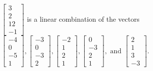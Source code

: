 \begin{exercise}
\begin{exerciseStatement}
  \end{exerciseStatement}
  \begin{exerciseAnswer}
   \(\left[\begin{array}{c}
3 \\
2 \\
12 \\
-1
\end{array}\right]\) 
  	 is  
	a linear combination of the vectors \(\left[\begin{array}{c}
-4 \\
0 \\
-5 \\
1
\end{array}\right] , \left[\begin{array}{c}
-3 \\
0 \\
-3 \\
2
\end{array}\right] , \left[\begin{array}{c}
-2 \\
1 \\
2 \\
1
\end{array}\right] , \left[\begin{array}{c}
0 \\
-3 \\
2 \\
1
\end{array}\right] , \text{ and } \left[\begin{array}{c}
2 \\
1 \\
3 \\
-3
\end{array}\right]\).

	
  


  \end{exerciseAnswer}
\end{exercise}
